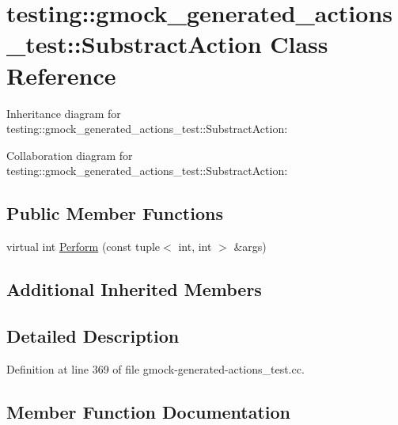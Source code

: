\hypertarget{classtesting_1_1gmock__generated__actions__test_1_1_substract_action}{}\section{testing\+:\+:gmock\+\_\+generated\+\_\+actions\+\_\+test\+:\+:Substract\+Action Class Reference}
\label{classtesting_1_1gmock__generated__actions__test_1_1_substract_action}


Inheritance diagram for testing\+:\+:gmock\+\_\+generated\+\_\+actions\+\_\+test\+:\+:Substract\+Action\+:


Collaboration diagram for testing\+:\+:gmock\+\_\+generated\+\_\+actions\+\_\+test\+:\+:Substract\+Action\+:
\subsection*{Public Member Functions}
\begin{DoxyCompactItemize}
\item 
virtual int \hyperlink{classtesting_1_1gmock__generated__actions__test_1_1_substract_action_ac049ec6196668e17ef7384e08914f2c3}{Perform} (const tuple$<$ int, int $>$ \&args)
\end{DoxyCompactItemize}
\subsection*{Additional Inherited Members}


\subsection{Detailed Description}


Definition at line 369 of file gmock-\/generated-\/actions\+\_\+test.\+cc.



\subsection{Member Function Documentation}
